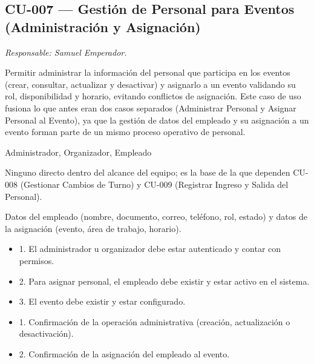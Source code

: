 \subsection{CU-007 --- Gestión de Personal para Eventos (Administración y Asignación)}
\label{cu:cu-007}
\textit{Responsable: Samuel Emperador.}

\begin{description}[leftmargin=!, labelwidth=3.4cm, style=nextline, topsep=3pt]
\item[Objetivo] Permitir administrar la información del personal que participa en los eventos (crear, consultar, actualizar y desactivar) y asignarlo a un evento validando su rol, disponibilidad y horario, evitando conflictos de asignación. Este caso de uso fusiona lo que antes eran dos casos separados (Administrar Personal y Asignar Personal al Evento), ya que la gestión de datos del empleado y su asignación a un evento forman parte de un mismo proceso operativo de personal.

\item[Actores] Administrador, Organizador, Empleado

\item[CU relacionados] Ninguno directo dentro del alcance del equipo; es la base de la que dependen CU-008 (Gestionar Cambios de Turno) y CU-009 (Registrar Ingreso y Salida del Personal).

\item[Entradas] Datos del empleado (nombre, documento, correo, teléfono, rol, estado) y datos de la asignación (evento, área de trabajo, horario).

\item[Pre-condiciones] \hfill
\begin{itemize}[leftmargin=1.2em, topsep=1pt]
  \item 1. El administrador u organizador debe estar autenticado y contar con permisos.
  \item 2. Para asignar personal, el empleado debe existir y estar activo en el sistema.
  \item 3. El evento debe existir y estar configurado.
\end{itemize}

\item[Salidas] \hfill
\begin{itemize}[leftmargin=1.2em, topsep=1pt]
  \item 1. Confirmación de la operación administrativa (creación, actualización o desactivación).
  \item 2. Confirmación de la asignación del empleado al evento.
\end{itemize}


\end{description}

